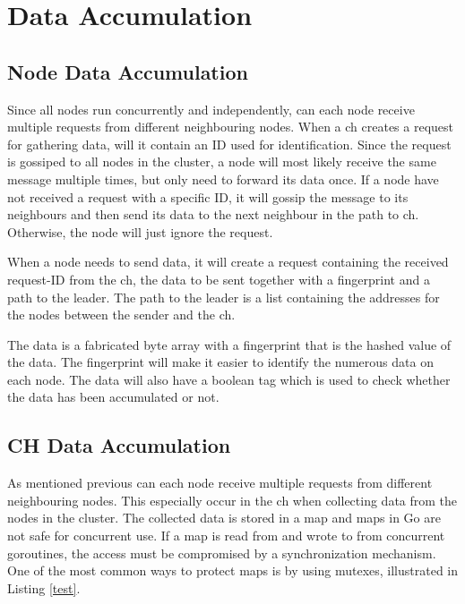 \documentclass[USenglish]{uit-thesis}
\begin{document}




\section{Data Accumulation}



\subsection{Node Data Accumulation}
Since all nodes run concurrently and independently, can each node receive multiple requests from different neighbouring nodes. When a \gls{ch} creates a request for gathering data, will it contain an ID used for identification. Since the request is gossiped to all nodes in the cluster, a node will most likely receive the same message multiple times, but only need to forward its data once. If a node have not received a request with a specific ID, it will gossip the message to its neighbours and then send its data to the next neighbour in the path to \gls{ch}. Otherwise, the node will just ignore the request.

When a node needs to send data, it will create a request containing the received request-ID from the \gls{ch}, the data to be sent together with a fingerprint and a path to the leader. The path to the leader is a list containing the addresses for the nodes between the sender and the \gls{ch}.

The data is a fabricated byte array with a fingerprint that is the hashed value of the data. The fingerprint will make it easier to identify the numerous data on each node. The data will also have a boolean tag which is used to check whether the data has been accumulated or not.

\subsection{CH Data Accumulation}
As mentioned previous can each node receive multiple requests from different neighbouring nodes.
This especially occur in the \gls{ch} when collecting data from the nodes in the cluster. The collected data is stored in a map and maps in Go are not safe for concurrent use. If a map is read from and wrote to from concurrent goroutines, the access must be compromised by a synchronization mechanism. One of the most common ways to protect maps is by using mutexes, illustrated in Listing \ref{test}.
\end{document}
